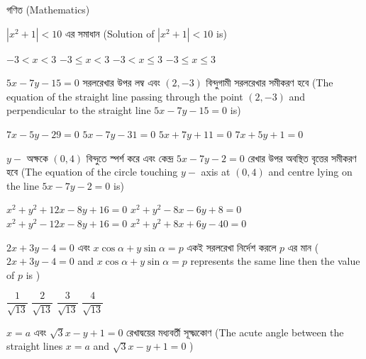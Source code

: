 \documentclass[addpoints]{exam}
\begin{document}
\begin{LARGE}
\begin{center}
গণিত (Mathematics)
\end{center}
\end{LARGE}
\begin{questions}

 \question $ |x^2 +1|<10 $  এর সমাধান (Solution of $ |x^2 +1|<10 $ is)

\begin{oneparchoices}
\choice $ -3<x<3 $
\choice $ -3\le x < 3 $
\choice $ -3<x \le 3 $
\choice $ -3 \le x \le 3 $

\end{oneparchoices}

\question  $ 5x -7y -15=0 $ সরলরেখার উপর লম্ব এবং $ (2,-3) $ বিন্দুগামী সরলরেখার সমীকরণ হবে (The equation of the straight line passing through the point $ (2,-3) $ and perpendicular to the straight line $ 5x-7y-15=0 $ is)

\begin{oneparchoices}
\choice $ 7x-5y-29=0 $
\choice $ 5x-7y-31=0 $
\choice $ 5x+7y+11=0 $
\choice  $ 7x+5y+1=0 $

\end{oneparchoices}

\question  $ y- $ অক্ষকে $ (0,4) $ বিন্দুতে স্পর্শ করে এবং কেন্দ্র $ 5x-7y-2=0 $ রেখার উপর অবস্থিত বৃত্তের সমীকরণ হবে (The equation of the circle touching $ y- $ axis at $ (0,4) $ and centre lying on the line $ 5x-7y-2=0 $ is)

\begin{oneparchoices}
\choice $ x^2 +y^2 + 12x-8y+16=0 $
\choice $ x^2 +y^2 -8x-6y+8=0 $ \\
\hspace*{-.45cm} \choice $ x^2 +y^2 - 12x-8y+16=0 $
\choice  $ x^2 +y^2 + 8x +6y-40=0 $

\end{oneparchoices}

\question  $ 2x +3y -4=0 $ এবং $ x\cos\alpha +y\sin\alpha= p$ একই সরলরেখা নির্দেশ করলে $ p $ এর মান ($ 2x +3y -4=0 $ and $ x\cos\alpha +y\sin\alpha= p$ represents the same line then the value of $ p $ is )

\begin{oneparchoices}
\choice $ \dfrac{1}{\sqrt{13}} $
\choice $ \dfrac{2}{\sqrt{13}} $
\choice $ \dfrac{3}{\sqrt{13}} $
\choice $ \dfrac{4}{\sqrt{13}} $

\end{oneparchoices}


\question  $ x=a $ এবং $ \sqrt{3}x-y+1=0 $ রেখাদ্বয়ের মধ্যবর্তী সূক্ষ্মকোণ (The acute angle between the straight lines $ x=a $ and $ \sqrt{3}x-y+1=0 $ )


\end{questions}
\end{document}
